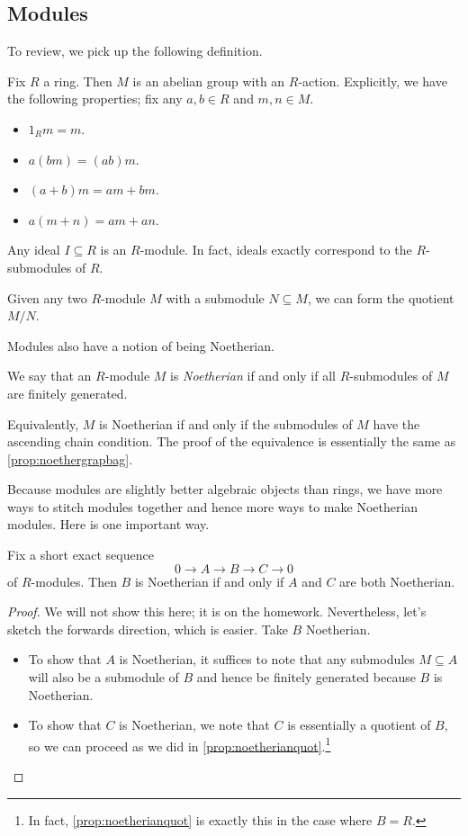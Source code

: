\subsection{Modules}
To review, we pick up the following definition.
\begin{definition}[Module]
	Fix $R$ a ring. Then $M$ is an abelian group with an $R$-action. Explicitly, we have the following properties; fix any $a,b\in R$ and $m,n\in M$.
	\begin{itemize}
		\item $1_Rm=m$.
		\item $a(bm)=(ab)m$.
		\item $(a+b)m=am+bm$.
		\item $a(m+n)=am+an$.
	\end{itemize}
\end{definition}
\begin{example}
	Any ideal $I\subseteq R$ is an $R$-module. In fact, ideals exactly correspond to the $R$-submodules of $R$.
\end{example}
\begin{example}
	Given any two $R$-module $M$ with a submodule $N\subseteq M$, we can form the quotient $M/N$.
\end{example}
Modules also have a notion of being Noetherian.
\begin{definition}
	We say that an $R$-module $M$ is \textit{Noetherian} if and only if all $R$-submodules of $M$ are finitely generated.
\end{definition}
\begin{remark}
	Equivalently, $M$ is Noetherian if and only if the submodules of $M$ have the ascending chain condition. The proof of the equivalence is essentially the same as \autoref{prop:noethergrapbag}.
\end{remark}
Because modules are slightly better algebraic objects than rings, we have more ways to stitch modules together and hence more ways to make Noetherian modules. Here is one important way.
\begin{proposition} \label{prop:noetherianses}
	Fix a short exact sequence
	\[0\to A\to B\to C\to 0\]
	of $R$-modules. Then $B$ is Noetherian if and only if $A$ and $C$ are both Noetherian.
\end{proposition}
\begin{proof}
	We will not show this here; it is on the homework. Nevertheless, let's sketch the forwards direction, which is easier. Take $B$ Noetherian.
	\begin{itemize}
		\item To show that $A$ is Noetherian, it suffices to note that any submodules $M\subseteq A$ will also be a submodule of $B$ and hence be finitely generated because $B$ is Noetherian.
		\item To show that $C$ is Noetherian, we note that $C$ is essentially a quotient of $B$, so we can proceed as we did in \autoref{prop:noetherianquot}.\footnote{In fact, \autoref{prop:noetherianquot} is exactly this in the case where $B=R$.}
		\qedhere
	\end{itemize}
\end{proof}
